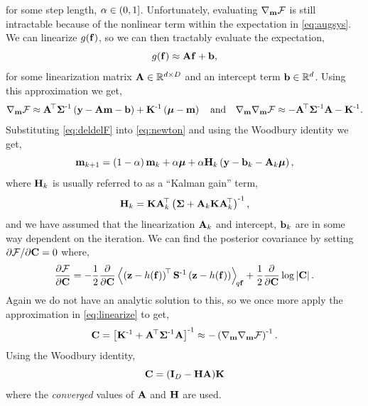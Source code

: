 \documentclass{article} %
\begin{document}
for some step length, $\step \in (0, 1]$. Unfortunately, evaluating
$\nabla_\pomean\Fengy$ is still intractable because of the nonlinear term
within the expectation in \eqref{eq:augsys}. We can linearize
$\nonlin{\lstate}$, so we can then tractably evaluate the expectation,
\begin{equation}
    \nonlin{\lstate} \approx \Linmat\lstate + \intcpt,
    \label{eq:linearize}
\end{equation}
for some linearization matrix $\Linmat \in \real{d \times D}$ and an intercept
term $\intcpt \in \real{d}$. Using this approximation we get,
\begin{equation}
    \nabla_\pomean \Fengy
        \approx \Linmat\transpose\lcov\inv\brac{\obs - \Linmat\pomean 
            - \intcpt} + \prcov\inv\brac{\prmean - \pomean}
    \quad \text{and} \quad
    \nabla_\pomean \nabla_\pomean \Fengy
        \approx - \Linmat\transpose\lcov\inv\Linmat - \prcov\inv.
        \label{eq:deldelF}
\end{equation}
Substituting \eqref{eq:deldelF} into \eqref{eq:newton} and using the Woodbury
identity we get,
\begin{equation}
    \pomean_{k+1} = \brac{1-\step}\pomean_k + \step\prmean 
        + \step\Kgain_k\brac{\obs - \intcpt_k - \Linmat_k\prmean},
    \label{eq:pomean}
\end{equation}
where $\Kgain_k$ is usually referred to as  a ``Kalman gain'' term,
\begin{equation}
    \Kgain_k = \prcov\Linmat_k\transpose\brac{\lcov +
        \Linmat_k\prcov\Linmat_k\transpose}\inv,
    \label{eq:kgain}
\end{equation}
and we have assumed that the linearization $\Linmat_k$ and intercept,
$\intcpt_k$ are in some way dependent on the iteration. We can find the 
posterior covariance by setting $\partial\Fengy/\partial\pocov = 0$ where,
\begin{equation}
    \frac{\partial\Fengy}{\partial\pocov} = -\frac{1}{2} 
        \frac{\partial}{\partial\pocov}
        \expec{q\lstate}{
            \brac{\augobs - \augnonlin{\lstate}}\transpose\augcov\inv
            \brac{\augobs - \augnonlin{\lstate}}
    } 
    + \frac{1}{2} \frac{\partial}{\partial\pocov} \log \deter{\pocov}.
\end{equation}
Again we do not have an analytic solution to this, so we once more apply the 
approximation in \eqref{eq:linearize} to get,
\begin{equation}
    \pocov = \sbrac{\prcov\inv + \Linmat\transpose\lcov\inv\Linmat}\inv
        \approx - \brac{\nabla_\pomean \nabla_\pomean \Fengy}\inv.
    \label{eq:pocovi}
\end{equation}
Using the Woodbury identity,
\begin{equation}
    \pocov = \brac{\ident{D} - \Kgain\Linmat}\!\prcov
    \label{eq:pocov}
\end{equation}
where the \emph{converged} values of $\Linmat$ and $\Kgain$ are used.
\end{document}
